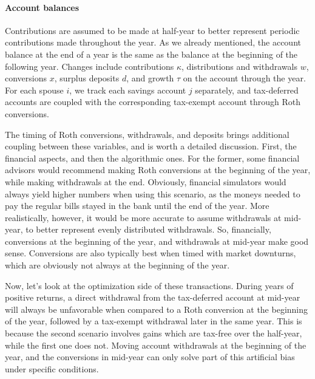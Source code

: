 \documentclass{report}[fleqn,11pt]
\begin{document}
\paragraph*{Account balances}
	Contributions are assumed to be made at half-year to better represent periodic contributions
	made throughout the year. As we already mentioned,
	the account balance at the end of a year is the same as the balance
	at the beginning of the following year.
	Changes include contributions $\kappa$, distributions and withdrawals $w$,
	conversions $x$, surplus deposits $d$, and growth $\tau$ on the account through the year.
	For each spouse $i$, we track each savings account $j$ separately, and tax-deferred accounts
	are coupled with the corresponding tax-exempt account through Roth conversions.

	The timing of Roth conversions, withdrawals, and deposits brings
	additional coupling between these variables, and is worth a detailed discussion.
	First, the financial aspects, and then the algorithmic ones.
	For the former, some financial advisors would recommend making Roth
	conversions at the beginning of the year, while making withdrawals
	at the end. Obviously, financial simulators would always yield higher numbers
	when using this scenario, as the moneys needed to pay the regular bills 
	stayed in the bank until the end of the year. More realistically,
	however, it would be more accurate to assume withdrawals at mid-year,
	to better represent evenly distributed withdrawals. So, financially,
	conversions at the beginning of the year, and withdrawals at mid-year
	make good sense. Conversions are also typically best when
	timed with market downturns, which are obviously not always at the
	beginning of the year.

	Now, let's look at the optimization side of these transactions.
	During years of positive returns,
	a direct withdrawal from the tax-deferred account at mid-year will always
	be unfavorable when compared to a Roth conversion
	at the beginning of the year, followed
	by a tax-exempt withdrawal later in the same year.
	This is because the second
	scenario involves gains which are tax-free over the half-year, while
	the first one does not. Moving account withdrawals at the beginning
	of the year, and the conversions in mid-year can only solve part of this artificial bias
	under specific conditions.
\end{document}
